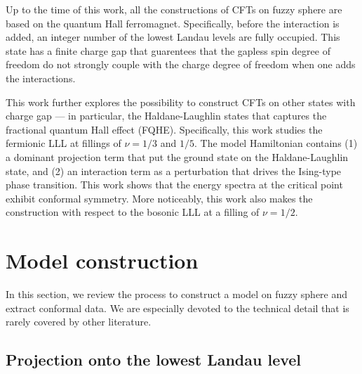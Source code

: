 \documentclass{timesjhep}
\begin{document}
Up to the time of this work, all the constructions of CFTs on fuzzy sphere are based on the quantum Hall ferromagnet. Specifically, before the interaction is added, an integer number of the lowest Landau levels are fully occupied. This state has a finite charge gap that guarentees that the gapless spin degree of freedom do not strongly couple with the charge degree of freedom when one adds the interactions. 

This work further explores the possibility to construct CFTs on other states with charge gap --- in particular, the Haldane-Laughlin states that captures the fractional quantum Hall effect (FQHE). Specifically, this work studies the fermionic LLL at fillings of $\nu=1/3$ and $1/5$. The model Hamiltonian contains (1) a dominant projection term that put the ground state on the Haldane-Laughlin state, and (2) an interaction term as a perturbation that drives the Ising-type phase transition. This work shows that the energy spectra at the critical point exhibit conformal symmetry. More noticeably, this work also makes the construction with respect to the bosonic LLL at a filling of $\nu=1/2$. 

\section{Model construction}
\label{sec:construct}

In this section, we review the process to construct a model on fuzzy sphere and extract conformal data. We are especially devoted to the technical detail that is rarely covered by other literature. 

\subsection{Projection onto the lowest Landau level}
\end{document}
